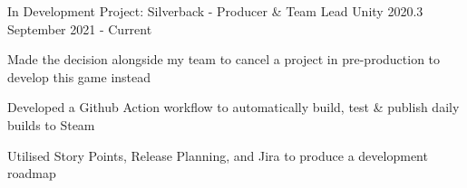 

\begin{cventries}

    \cventry
    {In Development}
    {Project: Silverback - Producer \& Team Lead}
    {Unity 2020.3}
    {September 2021 - Current}
    {
        \begin{cvitems}
            \item Made the decision alongside my team to cancel a project in pre-production to develop this game instead
            \item Developed a Github Action workflow to automatically build, test \& publish daily builds to Steam
            \item Utilised Story Points, Release Planning, and Jira to produce a development roadmap
        \end{cvitems}  
    }



\end{cventries}
